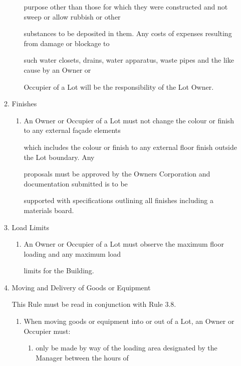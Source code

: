 \documentclass{article}
\begin{document}
\begin{enumerate}[label=\arabic*.]
\begin{enumerate}[label=\arabic{enumi}.\arabic*.]
\begin{enumerate}[label=(\arabic*)]
purpose other than those for which they were constructed and not sweep or allow rubbish or other 

substances to be deposited in them. Any costs of expenses resulting from damage or blockage to 

such water closets, drains, water apparatus, waste pipes and the like cause by an Owner or 

Occupier of a Lot will be the responsibility of the Lot Owner. 

\end{enumerate}
\item  Finishes 

\begin{enumerate}[label=(\arabic*)]
\item  An Owner or Occupier of a Lot must not change the colour or finish to any external façade elements 

which includes the colour or finish to any external floor finish outside the Lot boundary. Any 

proposals must be approved by the Owners Corporation and documentation submitted is to be 

supported with specifications outlining all finishes including a materials board. 

\end{enumerate}
\item  Load Limits 

\begin{enumerate}[label=(\arabic*)]
\item  An Owner or Occupier of a Lot must observe the maximum floor loading and any maximum load 

limits for the Building. 

\newpage

\end{enumerate}
\item  Moving and Delivery of Goods or Equipment 

This Rule must be read in conjunction with Rule 3.8. 

\begin{enumerate}[label=(\arabic*)]
\item  When moving goods or equipment into or out of a Lot, an Owner or Occupier must: 

\begin{enumerate}[label=(\alph*)]
\item  only be made by way of the loading area designated by the Manager between the hours of 


\end{enumerate}
\end{enumerate}
\end{enumerate}
\end{enumerate}
\end{document}
